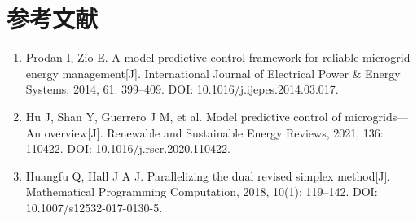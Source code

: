 \section{参考文献}
\begin{enumerate}\renewcommand{\labelenumi}{[\theenumi]}
\item Prodan I, Zio E. A model predictive control framework for reliable microgrid energy management[J]. International Journal of Electrical Power \& Energy Systems, 2014, 61: 399--409. DOI: 10.1016/j.ijepes.2014.03.017.
\item Hu J, Shan Y, Guerrero J M, et al. Model predictive control of microgrids---An overview[J]. Renewable and Sustainable Energy Reviews, 2021, 136: 110422. DOI: 10.1016/j.rser.2020.110422.
\item Huangfu Q, Hall J A J. Parallelizing the dual revised simplex method[J]. Mathematical Programming Computation, 2018, 10(1): 119--142. DOI: 10.1007/s12532-017-0130-5.
\end{enumerate}
